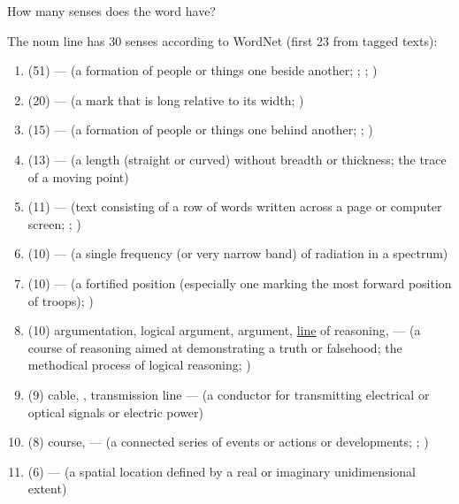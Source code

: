 \documentclass[a4paper,landscape,headrule,footrule,xetex]{foils}
\begin{document}

How many senses does the word  have?


The noun line has 30 senses according to WordNet (first 23 from tagged texts):

\begin{enumerate}
\item (51)  --- (a formation of people or things one beside another; ; ; )
\item (20)  --- (a mark that is long relative to its width; )
\item (15)  --- (a formation of people or things one behind another; ; )
\item (13)  --- (a length (straight or curved) without breadth or thickness; the trace of a moving point)
\item (11)  --- (text consisting of a row of words written across a page or computer screen; ; )
\item (10)  --- (a single frequency (or very narrow band) of radiation in a spectrum)
\item (10)  --- (a fortified position (especially one marking the most forward position of troops); )
\item (10) argumentation, logical argument, argument, \ul{line} of reasoning,  --- (a course of reasoning aimed at demonstrating a truth or falsehood; the methodical process of logical reasoning; )
\item (9) cable, , transmission line --- (a conductor for transmitting electrical or optical signals or electric power)
\item (8) course,  --- (a connected series of events or actions or developments; ; )
\item (6)  --- (a spatial location defined by a real or imaginary unidimensional extent)

\end{enumerate}
\end{document}
